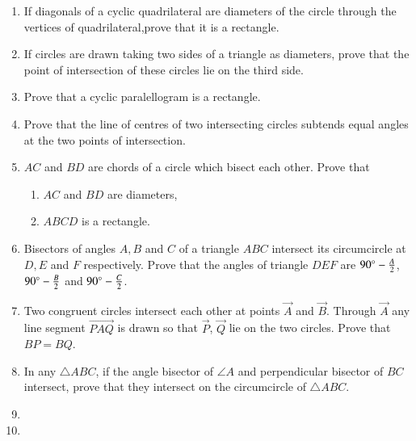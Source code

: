 \begin{enumerate}[label=\thesection.\arabic*,ref=\thesection.\theenumi]
\item If diagonals of a cyclic quadrilateral are diameters of the circle through the vertices of quadrilateral,prove that it is a rectangle.\\
\label{chapters/9/10/5/7}
\solution

\item If circles are drawn taking two sides of a triangle as diameters, prove that the point of intersection of these circles lie on the third side.
\label{chapters/9/10/5/10}
\\
\solution

    \item Prove that a cyclic paralellogram is a rectangle.
\label{chapters/9/10/5/12}
\\
\solution

\item Prove that the line of centres of two intersecting circles subtends equal angles at the two points of intersection.
\\
    \solution 
\label{chapters/9/10/6/1}

\item  $AC$ and $BD$ are chords of a circle which bisect each other. Prove that 
	\begin{enumerate}
		\item  $AC$ and $BD$ are diameters, 
		\item  $ABCD$ is a rectangle.
	\end{enumerate}
    \solution 
\label{chapters/9/10/6/7}

\item Bisectors of angles $A,B$ and $C$ of a triangle $ABC$ intersect its circumcircle at $D,E$ and $F$ respectively. Prove that the angles of triangle $DEF$ are $90{\degree} - \frac{A}{2}$, $90{\degree}-\frac{B}{2}$ and $90{\degree} - \frac{C}{2}$.
\label{chapters/9/10/6/8}
\\
    \solution 

\item Two congruent circles intersect each other at points $\vec{A}$ and $\vec{B}$. Through $\vec{A}$ any line segment $\vec{PAQ}$ is drawn so that $\vec{P}$, $\vec{Q}$ lie on the two circles. Prove that $BP = BQ$.
\label{chapters/9/10/6/9}
\\
    \solution 

\item In any $\triangle ABC$, if the angle bisector of $\angle A$ and 
    perpendicular bisector of $BC$ intersect, prove that they intersect on 
    the circumcircle of $\triangle ABC$.
\\
    \solution 
\label{chapters/9/10/6/10}


\item

\item

\end{enumerate}
